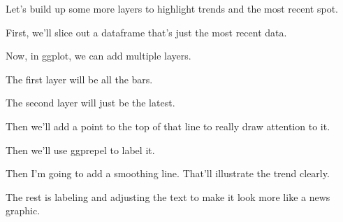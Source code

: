 \documentclass[]{book}
\newenvironment{Shaded}{\begin{snugshade}}{\end{snugshade}}
\newcommand{\DecValTok}[1]{\textcolor[rgb]{0.00,0.00,0.81}{#1}}
\newcommand{\KeywordTok}[1]{\textcolor[rgb]{0.13,0.29,0.53}{\textbf{#1}}}
\newcommand{\NormalTok}[1]{#1}
\newcommand{\OperatorTok}[1]{\textcolor[rgb]{0.81,0.36,0.00}{\textbf{#1}}}
\newcommand{\StringTok}[1]{\textcolor[rgb]{0.31,0.60,0.02}{#1}}
\begin{document}
Let's build up some more layers to highlight trends and the most recent spot.

First, we'll slice out a dataframe that's just the most recent data.

\begin{Shaded}
\end{Shaded}

Now, in ggplot, we can add multiple layers.

The first layer will be all the bars.

The second layer will just be the latest.

Then we'll add a point to the top of that line to really draw attention to it.

Then we'll use ggprepel to label it.

Then I'm going to add a smoothing line. That'll illustrate the trend clearly.

The rest is labeling and adjusting the text to make it look more like a news graphic.
\end{document}
